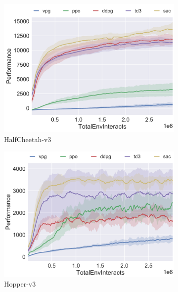 \documentclass[12pt,twoside]{report}
\begin{document}
\begin{figure}[h]
     \centering
     \begin{subfigure}[b]{0.4\textwidth}
         \centering
         \includegraphics[width=\textwidth]{figures/OpenAI benchmarks/halfcheetah pt.png}
         \caption{HalfCheetah-v3}
     \end{subfigure}
     \quad
     \begin{subfigure}[b]{0.4\textwidth}
         \centering
         \includegraphics[width=\textwidth]{figures/OpenAI benchmarks/hopper pt.png}
         \caption{Hopper-v3}
     \end{subfigure}
     \quad
     \begin{subfigure}[b]{0.4\textwidth}
         \centering

\end{subfigure}
\end{figure}
\end{document}
